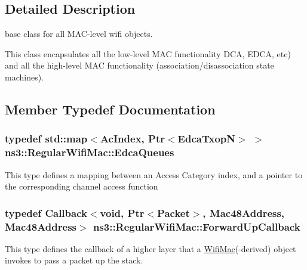 \subsection{Detailed Description}
base class for all M\+A\+C-\/level wifi objects.

This class encapsulates all the low-\/level M\+AC functionality D\+CA, E\+D\+CA, etc) and all the high-\/level M\+AC functionality (association/disassociation state machines). 

\subsection{Member Typedef Documentation}
\subsubsection[{\texorpdfstring{Edca\+Queues}{EdcaQueues}}]{\setlength{\rightskip}{0pt plus 5cm}typedef std\+::map$<${\bf Ac\+Index}, {\bf Ptr}$<${\bf Edca\+TxopN}$>$ $>$ {\bf ns3\+::\+Regular\+Wifi\+Mac\+::\+Edca\+Queues}\hspace{0.3cm}{\ttfamily [protected]}}\hypertarget{classns3_1_1RegularWifiMac_af5fd1332c45fb685ed18480b8f73d6b8}{}\label{classns3_1_1RegularWifiMac_af5fd1332c45fb685ed18480b8f73d6b8}
This type defines a mapping between an Access Category index, and a pointer to the corresponding channel access function 
\subsubsection[{\texorpdfstring{Forward\+Up\+Callback}{ForwardUpCallback}}]{\setlength{\rightskip}{0pt plus 5cm}typedef {\bf Callback}$<$void, {\bf Ptr}$<${\bf Packet}$>$, {\bf Mac48\+Address}, {\bf Mac48\+Address}$>$ {\bf ns3\+::\+Regular\+Wifi\+Mac\+::\+Forward\+Up\+Callback}}\hypertarget{classns3_1_1RegularWifiMac_a7f9bf4f4f1fc2514fcbf651015929225}{}\label{classns3_1_1RegularWifiMac_a7f9bf4f4f1fc2514fcbf651015929225}
This type defines the callback of a higher layer that a \hyperlink{classns3_1_1WifiMac}{Wifi\+Mac}(-\/derived) object invokes to pass a packet up the stack.


